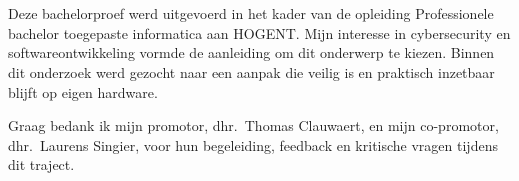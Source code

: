
\chapter*{}%
\label{ch:voorwoord}

Deze bachelorproef werd uitgevoerd in het kader van de opleiding Professionele bachelor toegepaste informatica aan HOGENT. Mijn interesse in cybersecurity en softwareontwikkeling vormde de aanleiding om dit onderwerp te kiezen. Binnen dit onderzoek werd gezocht naar een aanpak die veilig is en praktisch inzetbaar blijft op eigen hardware.

Graag bedank ik mijn promotor, dhr.\ Thomas Clauwaert, en mijn co-promotor, dhr.\ Laurens Singier, voor hun begeleiding, feedback en kritische vragen tijdens dit traject.
